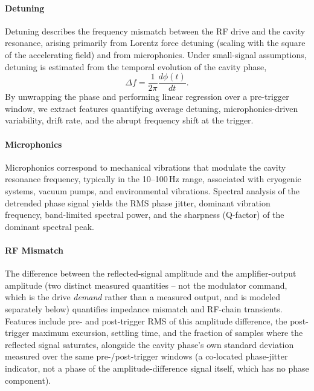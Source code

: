 \paragraph{Detuning}

Detuning describes the frequency mismatch between the RF drive and the cavity resonance, arising primarily from Lorentz force detuning (scaling with the square of the accelerating field) and from microphonics. Under small-signal assumptions, detuning is estimated from the temporal evolution of the cavity phase,
\begin{equation}
\Delta f = \frac{1}{2\pi}\frac{d\phi(t)}{dt}. %
\end{equation}
By unwrapping the phase and performing linear regression over a pre-trigger window, we extract features quantifying average detuning, microphonics-driven variability, drift rate, and the abrupt frequency shift at the trigger.

\paragraph{Microphonics}

Microphonics correspond to mechanical vibrations that modulate the cavity resonance frequency, typically in the 10--100\,Hz range, associated with cryogenic systems, vacuum pumps, and environmental vibrations. %
Spectral analysis of the detrended phase signal yields the RMS phase jitter, dominant vibration frequency, band-limited spectral power, and the sharpness (Q-factor) of the dominant spectral peak.

\paragraph{RF Mismatch}

The difference between the reflected-signal amplitude and the amplifier-output amplitude (two distinct measured quantities -- not the modulator command, which is the drive \emph{demand} rather than a measured output, and is modeled separately below) quantifies impedance mismatch and RF-chain transients. Features include pre- and post-trigger RMS of this amplitude difference, the post-trigger maximum excursion, settling time, and the fraction of samples where the reflected signal saturates, alongside the cavity phase's own standard deviation measured over the same pre-/post-trigger windows (a co-located phase-jitter indicator, not a phase of the amplitude-difference signal itself, which has no phase component).


